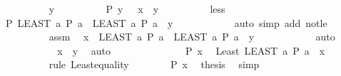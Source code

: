 \begin{isabellebody}
\ \ \ \ \ \ \ \ \isamarkupfalse%
\ y\isanewline
\ \ \ \ \ \ \ \ \isamarkupfalse%
\ {\isachardoublequoteopen}P\ y{\isachardoublequoteclose}\ \ {\isachardoublequoteopen}{\isasymnot}\ x\ {\isasymle}\ y{\isachardoublequoteclose}\isanewline
\ \ \ \ \ \ \ \ \isamarkupfalse%
\ less\ \isamarkupfalse%
\ {\isachardoublequoteopen}P\ {\isacharparenleft}{\kern0pt}LEAST\ a{\isachardot}{\kern0pt}\ P\ a{\isacharparenright}{\kern0pt}{\isachardoublequoteclose}\ \ {\isachardoublequoteopen}{\isacharparenleft}{\kern0pt}LEAST\ a{\isachardot}{\kern0pt}\ P\ a{\isacharparenright}{\kern0pt}\ {\isasymle}\ y{\isachardoublequoteclose}\isanewline
\ \ \ \ \ \ \ \ \ \ \isamarkupfalse%
\ {\isacharparenleft}{\kern0pt}auto\ simp\ add{\isacharcolon}{\kern0pt}\ not{\isacharunderscore}{\kern0pt}le{\isacharparenright}{\kern0pt}\isanewline
\ \ \ \ \ \ \ \ \isamarkupfalse%
\ assm\ \isamarkupfalse%
\ {\isachardoublequoteopen}x\ {\isacharless}{\kern0pt}\ {\isacharparenleft}{\kern0pt}LEAST\ a{\isachardot}{\kern0pt}\ P\ a{\isacharparenright}{\kern0pt}{\isachardoublequoteclose}\ \ {\isachardoublequoteopen}{\isacharparenleft}{\kern0pt}LEAST\ a{\isachardot}{\kern0pt}\ P\ a{\isacharparenright}{\kern0pt}\ {\isasymle}\ y{\isachardoublequoteclose}\isanewline
\ \ \ \ \ \ \ \ \ \ \isamarkupfalse%
\ auto\isanewline
\ \ \ \ \ \ \ \ \isamarkupfalse%
\ \isamarkupfalse%
\ {\isachardoublequoteopen}x\ {\isasymle}\ y{\isachardoublequoteclose}\ \isamarkupfalse%
\ auto\isanewline
\ \ \ \ \ \ \isamarkupfalse%
\isanewline
\ \ \ \ \ \ \isamarkupfalse%
\ {\isacartoucheopen}P\ x{\isacartoucheclose}\ \isamarkupfalse%
\ Least{\isacharcolon}{\kern0pt}\ {\isachardoublequoteopen}{\isacharparenleft}{\kern0pt}LEAST\ a{\isachardot}{\kern0pt}\ P\ a{\isacharparenright}{\kern0pt}\ {\isacharequal}{\kern0pt}\ x{\isachardoublequoteclose}\isanewline
\ \ \ \ \ \ \ \ \isamarkupfalse%
\ {\isacharparenleft}{\kern0pt}rule\ Least{\isacharunderscore}{\kern0pt}equality{\isacharparenright}{\kern0pt}\isanewline
\ \ \ \ \ \ \isamarkupfalse%
\ {\isacartoucheopen}P\ x{\isacartoucheclose}\ \isamarkupfalse%
\ {\isacharquery}{\kern0pt}thesis\ \isamarkupfalse%
\ simp\isanewline
\ \ \ \ \isamarkupfalse%
\isanewline
\ \ \isamarkupfalse%
\isanewline
\ \ \isamarkupfalse%

\end{isabellebody}
